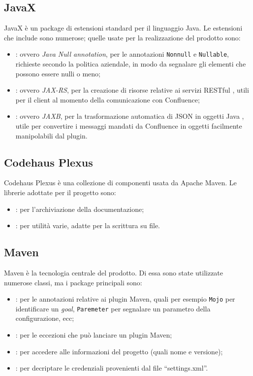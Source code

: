\subsection{JavaX}
JavaX è un package di estensioni standard per il linguaggio Java.
Le estensioni che include sono numerose; quelle usate per la realizzazione del prodotto sono:
\begin{itemize}
    \item {}: ovvero \emph{Java Null annotation}, per le annotazioni  \texttt{Nonnull} e  \texttt{Nullable}, richieste secondo la politica aziendale, in modo da segnalare gli elementi che possono essere nulli o meno;
    \item {}: ovvero \emph{JAX-RS}, per la creazione di risorse relative ai servizi RESTful \cite{site:jax-rs}, utili per il client al momento della comunicazione con Confluence;
    \item {}: ovvero \emph{JAXB}, per la trasformazione automatica di JSON in oggetti Java \cite{site:jaxb}, utile per convertire i messaggi mandati da Confluence in oggetti facilmente manipolabili dal plugin.
\end{itemize}


\subsection{Codehaus Plexus}
Codehaus Plexus è una collezione di componenti usata da Apache Maven.
Le librerie adottate per il progetto sono:
\begin{itemize}
    \item {}: per l'archiviazione della documentazione;
    \item {}: per utilità varie, adatte per la scrittura su file.
\end{itemize}


\subsection{Maven}
Maven è la tecnologia centrale del prodotto.
Di essa sono state utilizzate numerose classi, ma i package principali sono:
\begin{itemize}
    \item {}: per le annotazioni relative ai plugin Maven, quali per esempio \texttt{Mojo} per identificare un \emph{goal},  \texttt{Paremeter} per segnalare un parametro della configurazione, ecc;
    \item {}: per le eccezioni che può lanciare un plugin Maven;
    \item {}: per accedere alle informazioni del progetto (quali nome e versione);
    \item {}: per decriptare le credenziali provenienti dal file ``settings.xml''.
\end{itemize}


